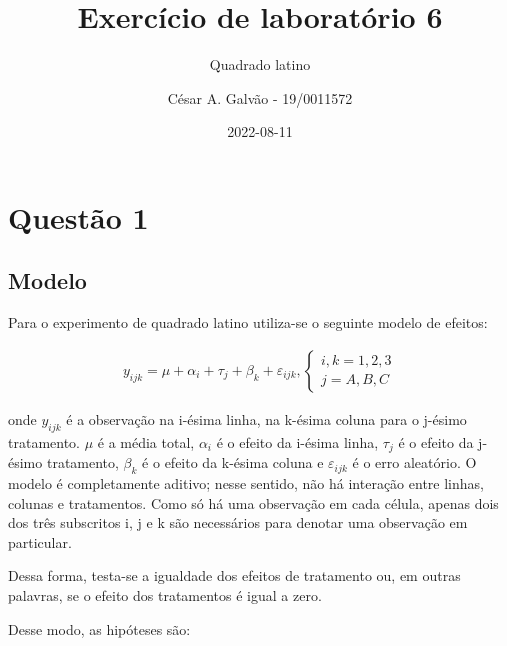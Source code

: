 \documentclass[
]{article}
\title{Exercício de laboratório 6}
\subtitle{Quadrado latino}
\author{César A. Galvão - 19/0011572}
\date{2022-08-11}
\begin{document}
\maketitle

\newpage{}

{
\setcounter{tocdepth}{2}
\tableofcontents
}
\let\oldsection\section
\renewcommand\section{\clearpage\oldsection}

\hypertarget{questuxe3o-1}{%
\section{Questão 1}\label{questuxe3o-1}}

\hypertarget{modelo}{%
\subsection{Modelo}\label{modelo}}

Para o experimento de quadrado latino utiliza-se o seguinte modelo de
efeitos:

\begin{align}
  y_{ijk} = \mu + \alpha_i + \tau_j + \beta_k + \varepsilon_{ijk}, 
  \begin{cases} 
  i, k = 1, 2, 3 \\
  j = A, B, C
  \end{cases}
\end{align}

onde \(y_{ijk}\) é a observação na i-ésima linha, na k-ésima coluna para
o j-ésimo tratamento. \(\mu\) é a média total, \(\alpha_i\) é o efeito
da i-ésima linha, \(\tau_j\) é o efeito da j-ésimo tratamento,
\(\beta_k\) é o efeito da k-ésima coluna e \(\varepsilon_{ijk}\) é o
erro aleatório. O modelo é completamente aditivo; nesse sentido, não há
interação entre linhas, colunas e tratamentos. Como só há uma observação
em cada célula, apenas dois dos três subscritos i, j e k são necessários
para denotar uma observação em particular.

Dessa forma, testa-se a igualdade dos efeitos de tratamento ou, em
outras palavras, se o efeito dos tratamentos é igual a zero.

Desse modo, as hipóteses são:
\end{document}

